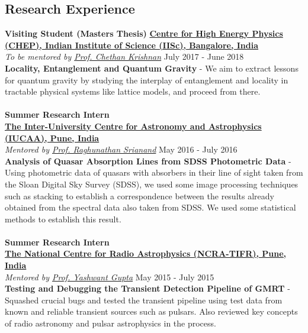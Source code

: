 \documentclass[margin, centered]{res}
\begin{document}
\begin{resume}
\section{Research Experience}
\textbf{Visiting Student (Masters Thesis)}
\textbf{\href{http://chep.iisc.ac.in/}{Centre for High Energy Physics (CHEP), Indian Institute of Science (IISc), Bangalore, India}}\\
\emph{To be mentored by \href{http://chep.iisc.ac.in/Personnel/pages/chethan/index.html}{Prof. Chethan Krishnan}} \hfill July 2017 - June 2018\\
\textbf{Locality, Entanglement and Quantum Gravity} - We aim to extract lessons for quantum gravity by studying the interplay of entanglement and locality in tractable physical systems like lattice models, and proceed from there. 
​ \\
\\
\textbf{Summer Research Intern}
\\
\textbf{\href{http://www.iucaa.ernet.in/}{The Inter-University Centre for Astronomy and Astrophysics (IUCAA), Pune, India}}
\\
\emph{Mentored by \href{http://www.iucaa.ernet.in/~anand/}{Prof. Raghunathan Srianand}} \hfill May 2016 - July 2016\\
\textbf{Analysis of Quasar Absorption Lines from SDSS Photometric Data} - Using photometric data of quasars with absorbers in their line of sight taken from the Sloan Digital Sky Survey (SDSS), we used some image processing techniques such as stacking to establish a correspondence between the results already obtained from the spectral data also taken from SDSS. We used some statistical methods to establish this result. \\
\\
\textbf{Summer Research Intern}\\
\textbf{\href{http://www.ncra.tifr.res.in/}{The National Centre for Radio Astrophysics (NCRA-TIFR), Pune, India}}\\
\emph{Mentored by \href{http://www.ncra.tifr.res.in/ncra/people/academic/ncra-faculty/Yashwant_Gupta}{Prof. Yashwant Gupta}} \hfill May 2015 - July 2015\\
\textbf{Testing and Debugging the Transient Detection Pipeline of GMRT} - Squashed crucial bugs and tested the transient pipeline using test data from known and reliable transient sources such as pulsars. Also reviewed key concepts of radio astronomy and pulsar astrophysics in the process.



\end{resume}
\end{document}
